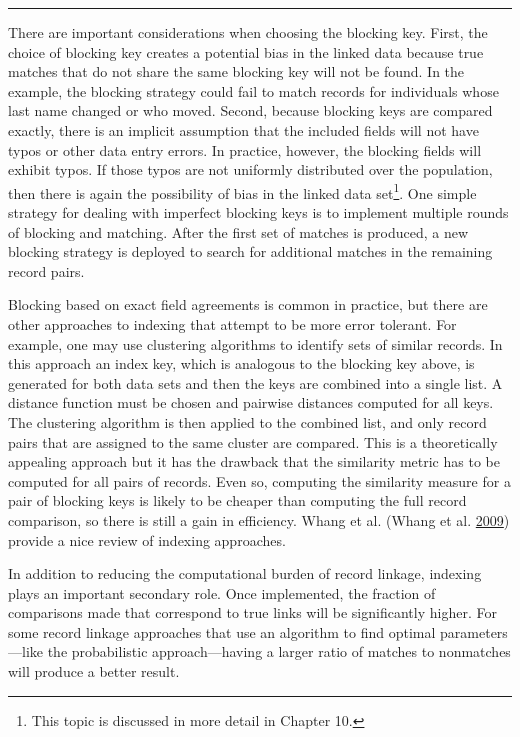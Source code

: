 \documentclass[]{krantz}
\begin{document}
\begin{center}\rule{0.5\linewidth}{\linethickness}\end{center}

There are important considerations when choosing the blocking key.
First, the choice of blocking key creates a potential bias in the linked
data because true matches that do not share the same blocking key will
not be found. In the example, the blocking strategy could fail to match
records for individuals whose last name changed or who moved. Second,
because blocking keys are compared exactly, there is an implicit
assumption that the included fields will not have typos or other data
entry errors. In practice, however, the blocking fields will exhibit
typos. If those typos are not uniformly distributed over the population,
then there is again the possibility of bias in the linked data
set\footnote{This topic is discussed in more detail in Chapter 10.}. One
simple strategy for dealing with imperfect blocking keys is to implement
multiple rounds of blocking and matching. After the first set of matches
is produced, a new blocking strategy is deployed to search for
additional matches in the remaining record pairs.

Blocking based on exact field agreements is common in practice, but
there are other approaches to indexing that attempt to be more error
tolerant. For example, one may use clustering algorithms to identify
sets of similar records. In this approach an index key, which is
analogous to the blocking key above, is generated for both data sets and
then the keys are combined into a single list. A distance function must
be chosen and pairwise distances computed for all keys. The clustering
algorithm is then applied to the combined list, and only record pairs
that are assigned to the same cluster are compared. This is a
theoretically appealing approach but it has the drawback that the
similarity metric has to be computed for all pairs of records. Even so,
computing the similarity measure for a pair of blocking keys is likely
to be cheaper than computing the full record comparison, so there is
still a gain in efficiency. Whang et al. (Whang et al.
\protect\hyperlink{ref-whang2009entity}{2009}) provide a nice review of
indexing approaches.

In addition to reducing the computational burden of record linkage,
indexing plays an important secondary role. Once implemented, the
fraction of comparisons made that correspond to true links will be
significantly higher. For some record linkage approaches that use an
algorithm to find optimal parameters---like the probabilistic
approach---having a larger ratio of matches to nonmatches will produce a
better result.
\end{document}
